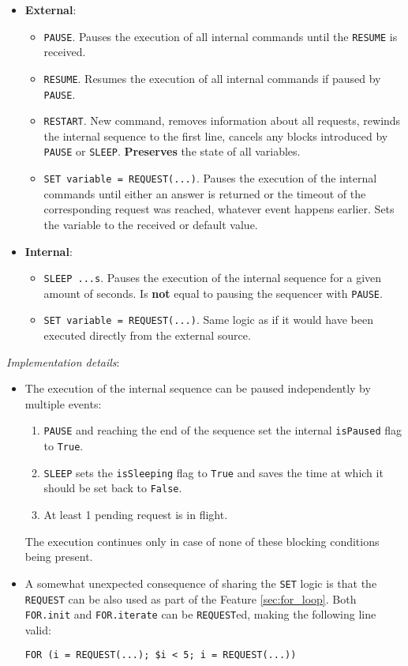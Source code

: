 \begin{itemize}
	\item \textbf{External}:
	\begin{itemize}
		\item \texttt{PAUSE}. Pauses the execution of all internal commands until the \texttt{RESUME} is received.
		\item \texttt{RESUME}. Resumes the execution of all internal commands if paused by \texttt{PAUSE}.
		\item \texttt{RESTART}. New command, removes information about all requests, rewinds the internal sequence to the first line, cancels any blocks introduced by \texttt{PAUSE} or \texttt{SLEEP}. \textbf{Preserves} the state of all variables.
		\item \texttt{SET variable = REQUEST(...)}. Pauses the execution of the internal commands until either an answer is returned or the timeout of the corresponding request was reached, whatever event happens earlier. Sets the variable to the received or default value.
	\end{itemize}
	\item \textbf{Internal}:
	\begin{itemize}
		\item \texttt{SLEEP ...s}. Pauses the execution of the internal sequence for a given amount of seconds. Is \textbf{not} equal to pausing the sequencer with \texttt{PAUSE}.
		\item \texttt{SET variable = REQUEST(...)}. Same logic as if it would have been executed directly from the external source.
	\end{itemize}
\end{itemize}

\newpage

\textit{Implementation details}:

\begin{itemize}
	\item{
		The execution of the internal sequence can be paused independently by multiple events:
		\begin{enumerate}
			\item \texttt{PAUSE} and reaching the end of the sequence set the internal \texttt{isPaused} flag to \texttt{True}.
			\item \texttt{SLEEP} sets the \texttt{isSleeping} flag to \texttt{True} and saves the time at which it should be set back to \texttt{False}.
			\item At least 1 pending request is in flight.
		\end{enumerate}
		The execution continues only in case of none of these blocking conditions being present.
	}
	\item{
		A somewhat unexpected consequence of sharing the \texttt{SET} logic is that the \texttt{REQUEST} can be also used as part of the Feature \ref{sec:for_loop}. Both \texttt{FOR.init} and \texttt{FOR.iterate} can be \texttt{REQUEST}ed, making the following line valid:
\begin{lstlisting}[language=n2EDMScript, numbers=none]
FOR (i = REQUEST(...); $i < 5; i = REQUEST(...))
\end{lstlisting}
	}
\end{itemize}

